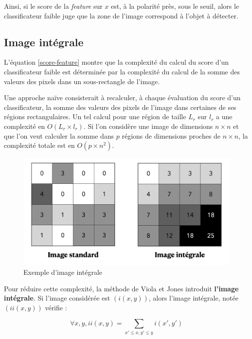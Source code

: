 \documentclass[12pt,a4paper]{article}
\begin{document}
Ainsi, si le score de la \textit{feature} sur $x$ est, à la polarité près, sous le seuil, alors le classificateur faible juge que la zone de l'image correspond à l'objet à détecter.

\subsection{Image intégrale}
L'équation \ref{score-feature} montre que la complexité du calcul du score d'un classificateur faible est déterminée par la complexité du calcul de la somme des valeurs des pixels dans un sous-rectangle de l'image.

Une approche naïve consisterait à recalculer, à chaque évaluation du score d'un classificateur, la somme des valeurs des pixels de l'image dans certaines de ses régions rectangulaires. Un tel calcul pour une région de taille $L_r$ sur $l_r$ a une complexité en $O(L_r \times l_r)$. Si l'on considère une image de dimensions $n \times n$ et que l'on veut calculer la somme dans $p$ régions de dimensions proches de $n \times n$, la complexité totale est en $O(p \times n^2)$.

\begin{figure}
        \includegraphics[scale = 0.35]{image-integrale2}
        \centering
        \caption{Exemple d'image intégrale}
    \end{figure}

Pour réduire cette complexité, la méthode de Viola et Jones introduit \textbf{l'image intégrale}. Si l'image considérée est $(i(x, y))$, alors l'image intégrale, notée $(ii(x, y))$ vérifie :

\begin{equation}
    \forall x, y, ii(x, y) = \sum_{x' \leq x, y' \leq y} i(x', y')
\end{equation}
\end{document}
